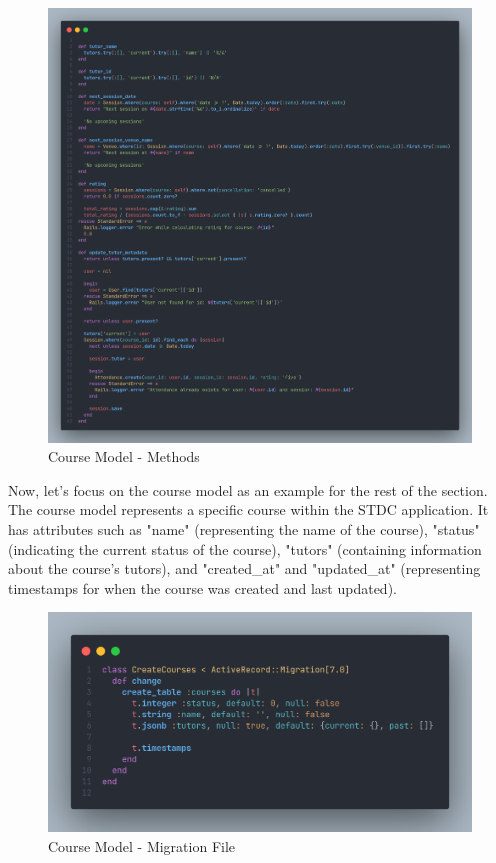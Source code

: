 \begin{justify}
        \begin{figure}[H]
            \centerline{\includegraphics[width=150mm,scale=1]{figures/implementation_and_testing/implementation/backend/course_methods.png}}
            \caption{Course Model - Methods}
        \end{figure}
        
        \vspace{-0.25cm}
        \newendline Now, let's focus on the course model as an example for the rest of the section. The course model represents a specific course within the STDC application. It has attributes such as "name" (representing the name of the course), "status" (indicating the current status of the course), "tutors" (containing information about the course's tutors), and "created\_at" and "updated\_at" (representing timestamps for when the course was created and last updated).
        
        \begin{figure}[H]
            \centerline{\includegraphics[width=150mm,scale=1]{figures/implementation_and_testing/implementation/backend/course_migrations.png}}
            \caption{Course Model - Migration File}
        \end{figure}


\end{justify}
